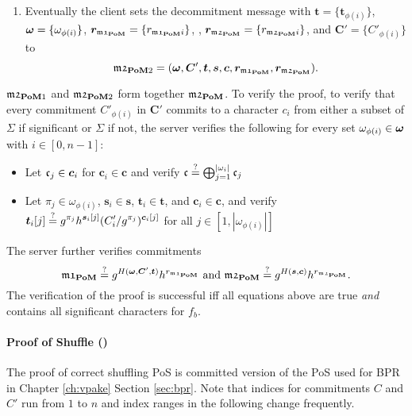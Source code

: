 \begin{enumerate}
  \item %
    Eventually the client sets the decommitment message with $\bm t = \{\bm t_{\phi(i)} \}$, $\boldsymbol{\mathbf{\omega}}=\{\omega_{\phi(i)}\}$, $\bm r_{\mathfrak{m1}_\mathsf{\bf PoM}}=\{r_{\mathfrak{m1}_\mathsf{\bf PoM} i}\}$, , $\bm r_{\mathfrak{m2}_\mathsf{\bf PoM}}=\{r_{\mathfrak{m2}_\mathsf{\bf PoM} i}\}$, and $\bm C'=\{C'_{\phi(i)}\}$ to
    \[\mathfrak{m2}_{\mathsf{\bf PoM}2}=(\boldsymbol{\mathbf{\omega}}, \bm C', \bm t, \bm s, \bm c, \bm r_{\mathfrak{m1}_\mathsf{\bf PoM}}, \bm r_{\mathfrak{m2}_\mathsf{\bf PoM}}).\]
\end{enumerate}

\noindent
$\mathfrak{m2}_{\mathsf{\bf PoM}1}$ and $\mathfrak{m2}_{\mathsf{\bf PoM}2}$ form together $\mathfrak{m2}_{\mathsf{\bf PoM}}$.
To verify the proof, \ie to verify that every commitment $C'_{\phi(i)}$ in $\bm C'$ commits to a character $c_i$ from either a subset of $\Sigma$ if significant or $\Sigma$ if not, the server verifies the following for every set $\omega_{\phi(i)} \in \boldsymbol{\mathbf{\omega}}$ with $i\in[0,n-1]$:
\begin{itemize}
% 

  \item Let $\mathfrak{c}_j\in\bm c_i$ for $\bm c_i\in\bm c$ and verify
        $\mathfrak{c} \stackrel{?}{=} \bigoplus_{j=1}^{|\omega_i|}\mathfrak{c}_j$

  \item Let $\pi_j\in\omega_{\phi(i)}$, $\bm s_i \in \bm s$, $\bm t_i\in \bm t$, and $\bm c_i \in \bm c$, and verify
        $\displaystyle \bm t_{i}[j] \stackrel{?}{=} g^{\pi_j}h^{\bm s_i[j]}(C'_i/g^{\pi_j})^{\bm c_i[j]}$
        for all $j\in[1,|\omega_{\phi(i)}|]$
\end{itemize}
The server further verifies commitments 
\[
  \mathfrak{m1}_\mathsf{\bf PoM} \stackrel{?}{=} g^{H(\boldsymbol{\mathbf{\omega}}, \bm C', \bm t)} h^{r_{\mathfrak{m1}_\mathsf{\bf PoM}}} \text{ and } \mathfrak{m2}_\mathsf{\bf PoM} \stackrel{?}{=} g^{H(\bm s, \bm c)} h^{r_{\mathfrak{m2}_\mathsf{\bf PoM}}}.
\]
The verification of the proof is successful iff all equations above are true \emph{and} \vect{\omega} contains all significant characters for $f_b$.

\paragraph{Proof of Shuffle (\PoS)}
The proof of correct shuffling \ac{PoS} is committed version of the \ac{PoS} used for \ac{BPR} in Chapter \ref{ch:vpake} Section \ref{sec:bpr}.
Note that indices for commitments $C$ and $C'$ run from $1$ to $n$ and index ranges in the following change frequently.

